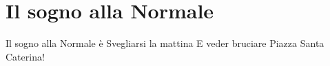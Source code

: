 \section{Il sogno alla Normale}
\subtitle{Sulla melodia di “Il sogno di un Pisano”}
\begin{canzone}
Il sogno alla Normale è 
Svegliarsi la mattina
E veder bruciare 
Piazza Santa Caterina!

\end{canzone}
